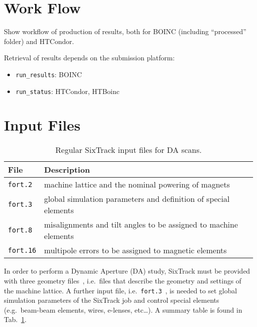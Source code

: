 \section{Work Flow}
Show workflow of production of results, both for BOINC (including ``processed''
folder) and HTCondor.

Retrieval of results depends on the submission platform:
\begin{itemize}
\item \texttt{run\_results}: BOINC
\item \texttt{run\_status}: HTCondor, HTBoinc
\end{itemize}

\section{Input Files}
\label{Sec:InputFiles}
\begin{table}[h]
\begin{center}
    \caption{Regular SixTrack input files for DA scans.}
    \label{tab:6TinpFiles}
    \begin{tabular}{|l|l|}
    \hline
    \rowcolor{blue!30}
    \textbf{File} & \textbf{Description} \\
    \hline
    \texttt{fort.2} & machine lattice and the nominal powering of magnets \\
    \hline
    \texttt{fort.3} & global simulation parameters and definition of special elements \\
    \hline
    \texttt{fort.8} & misalignments and tilt angles to be assigned to machine elements \\
    \hline
    \texttt{fort.16} & multipole errors to be assigned to magnetic elements \\
    \hline
    \end{tabular}
\end{center}
\end{table}
In order to perform a Dynamic Aperture (DA) study, SixTrack must be
provided with three geometry files~\cite{SixTrack_user_manual},
i.e.~files that describe the geometry and settings of the machine lattice.
A further input file, i.e.~\texttt{fort.3}~\cite{SixTrack_user_manual},
is needed to set global simulation parameters of the SixTrack job and
control special elements (e.g.~beam-beam elements, wires,
e-lenses, etc\ldots).
A summary table is found in Tab.~\ref{tab:6TinpFiles}.


